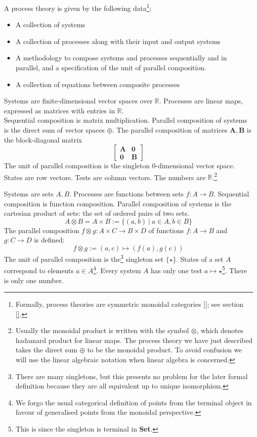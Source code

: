 A process theory is given by the following data\footnote{Formally, process theories are symmetric monoidal categories []; see section \ref{}.}:
\begin{itemize}
    \item A collection of systems
    \item A collection of processes along with their input and output systems
    \item A methodology to compose systems and processes sequentially and in parallel, and a specification of the unit of parallel composition.
    \item A collection of equations between composite processes
\end{itemize}

\begin{example}
Systems are finite-dimensional vector spaces over $\mathbb{R}$. Processes are linear maps, expressed as matrices with entries in $\mathbb{R}$.\\
Sequential composition is matrix multiplication. Parallel composition of systems is the direct sum of vector spaces $\oplus$. The parallel composition of matrices $\mathbf{A}, \mathbf{B}$ is the block-diagonal matrix
$$\begin{bmatrix}
\mathbf{A} & \mathbf{0} \\
\mathbf{0} & \mathbf{B}
\end{bmatrix}$$
The unit of parallel composition is the singleton 0-dimensional vector space.
States are row vectors. Tests are column vectors. The numbers are $\mathbb{R}$.\footnote{Usually the monoidal product is written with the symbol $\otimes$, which denotes hadamard product for linear maps. The process theory we have just described takes the direct sum $\oplus$ to be the monoidal product. To avoid confusion we will use the linear algebraic notation when linear algebra is concerned.}
\end{example}

\begin{example}
Systems are sets $A,B$. Processes are functions between sets $f: A \rightarrow B$. Sequential composition is function composition. Parallel composition of systems is the cartesian product of sets: the set of ordered pairs of two sets.
\[A \otimes B = A \times B := \{(a,b) \ | \ a \in A, b \in B\}\]
The parallel composition $f \otimes g : A \times C \rightarrow B \times D$ of functions $f: A \rightarrow B$ and $g: C \rightarrow D$ is defined:
\[f \otimes g := (a,c) \mapsto (f(a),g(c))\]
The unit of parallel composition is the\footnote{There are many singletons, but this presents no problem for the later formal definition because they are all equivalent up to unique isomorphism.} singleton set $\{\star\}$. States of a set $A$ correspond to elements $a \in A$\footnote{We forgo the usual categorical definition of points from the terminal object in favour of generalised points from the monoidal perspective.}. Every system $A$ has only one test $a \mapsto \star$\footnote{This is since the singleton is terminal in \textbf{Set}.}. There is only one number.
\end{example}

